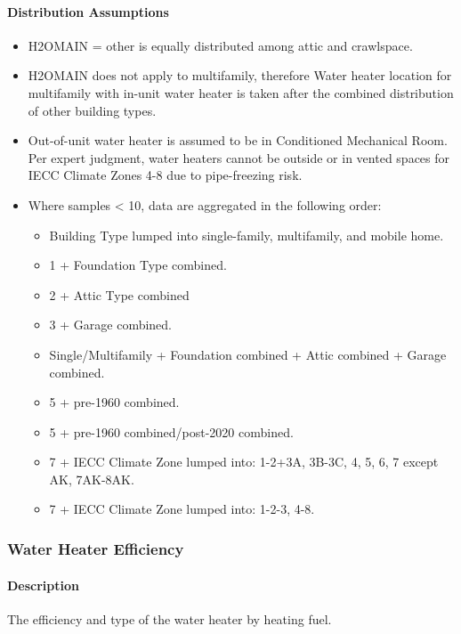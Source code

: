 \paragraph{Distribution Assumptions}
\begin{itemize}
\item
  H2OMAIN = other is equally distributed among attic and crawlspace.
\item
  H2OMAIN does not apply to multifamily, therefore Water heater
  location for multifamily with in-unit water heater is taken after the
  combined distribution of other building types.
\item
  Out-of-unit water heater is assumed to be in Conditioned Mechanical
  Room. Per expert judgment, water heaters cannot be outside or in
  vented spaces for IECC Climate Zones 4-8 due to pipe-freezing risk.
\item
  Where samples \textless{} 10, data are aggregated in the following
  order:
  \begin{itemize}
\item
  Building Type lumped into single-family, multifamily, and mobile
  home.
\item
  1 + Foundation Type combined. 
\item 
2 + Attic Type combined
\item
  3 + Garage combined.
\item
  Single/Multifamily + Foundation combined + Attic combined +
  Garage combined.
\item
  5 + pre-1960 combined.
\item
  5 + pre-1960 combined/post-2020 combined.
\item
  7 + IECC Climate Zone lumped into: 1-2+3A, 3B-3C, 4, 5, 6, 7 except
  AK, 7AK-8AK.
\item
  7 + IECC Climate Zone lumped into: 1-2-3, 4-8.
\end{itemize}
\end{itemize}

\subsubsection{Water Heater Efficiency}\label{water_heater_efficiency}
\paragraph{Description}
The efficiency and type of the water heater by heating fuel.


